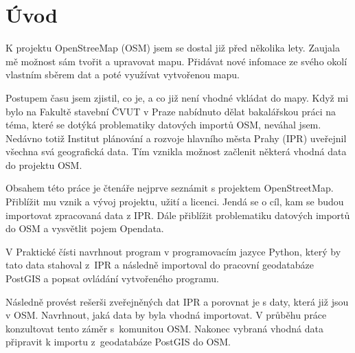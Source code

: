 \chapter{Úvod}
\label{1-uvod}

K projektu OpenStreeMap (OSM) jsem se dostal již před několika lety.
Zaujala mě možnost sám tvořit a upravovat mapu.
Přidávat nové infomace ze svého okolí vlastním sběrem dat
a poté využívat vytvořenou mapu.

Postupem času jsem zjistil, co je, a co již není vhodné vkládat do mapy.
Když mi bylo na Fakultě stavební ČVUT v Praze nabídnuto dělat
bakalářskou práci na téma, které se dotýká problematiky datových importů OSM,
neváhal jsem. Nedávno totiž Institut plánování a rozvoje hlavního města Prahy
(IPR) uveřejnil všechna svá geografická data.
Tím vznikla možnost začlenit některá vhodná data do projektu OSM.

Obsahem této práce je čtenáře nejprve seznámit s projektem
OpenStreetMap. Přiblížit mu vznik a vývoj projektu, užití a licenci.
Jendá se o cíl, kam se budou importovat zpracovaná data z IPR.
Dále přiblížit problematiku datových importů do OSM a vysvětlit
pojem Opendata.

V Praktické čísti navrhnout program v programovacím jazyce Python,
který by tato data stahoval z~IPR a následně importoval do pracovní
geodatabáze PostGIS a popsat ovládání vytvořeného programu.

Následně provést rešerši zveřejněných dat IPR a porovnat je s daty,
která již jsou v OSM. Navrhnout, jaká data by byla vhodná importovat.
V průběhu práce konzultovat tento záměr s~komunitou OSM.
Nakonec vybraná vhodná data připravit k importu z~geodatabáze PostGIS
do OSM.
